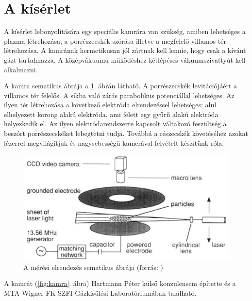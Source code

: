 \section{A kísérlet}
	A kísérlet lebonyolítására egy speciális kamrára van szükség, amiben lehetséges a plazma
	létrehozása, a porrészecskék szórása illetve a megfelelő villamos tér létrehozása.
	A kamrának hermetikusan jól zártnak kell lennie, hogy csak a kívánt gázt tartalmazza.
	A középvákuumú működéshez kétlépéses vákuumszivattyút kell alkalmazni.
	
	
	A kamra sematikus ábrája a \ref{fig:meresch}. ábrán látható.
	A porrészecskék levitációjáért a villamos tér felelős. A síkba való zárás parabolikus
	potenciállal lehetséges. Az ilyen tér létrehozása a következő elektróda elrendezéssel lehetséges:
	alul elhelyezett korong alakú elektróda, ami felett egy gyűrű alakú elektróda helyezkedik el.
	Az ilyen elektródarendszerre kapcsolt váltakozó feszültség a beszórt porrészecskéket lebegtetni
	tudja. Továbbá a részecskék követéséhez azokat lézerrel megvilágítjuk és nagysebességű kamerával
	felvételt készítünk róla.
	
	\begin{figure}[H]
		\centering
		\includegraphics[width=0.9\columnwidth]{figures/eps/dust_camera.eps}
		\caption[A mérési elrendezés sematikus ábrája]{A mérési elrendezés sematikus ábrája (forrás: \cite{Merlino2006})} 
		\label{fig:meresch}
	\end{figure}
	
	A kamrát (\ref{fig:kamra}. ábra) Hartmann Péter külső konzulensem építette és a MTA Wigner FK SZFI
	Gázkisülési Laboratóriumában található.
	
